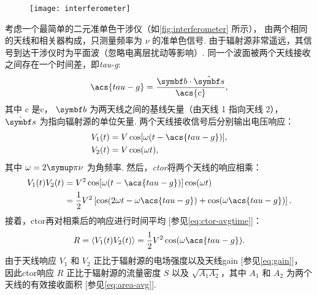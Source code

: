 \begin{figure}[htp]
  \centering
  \texttt{[image: interferometer]}
  \label{fig:interferometer}
\end{figure}

考虑一个最简单的二元准单色干涉仪（如\autoref{fig:interferometer} 所示），
由两个相同的天线和相关器构成，只测量频率为 $\nu$ 的准单色信号.
由于辐射源非常遥远，其信号到达干涉仪时为平面波（忽略电离层扰动等影响）.
同一个波面被两个天线接收之间存在一个时间差，即\emph{\acf{tau-g}}:
\begin{equation}
  \label{eq:tau-g}
  \acs{tau-g} = \frac{\B{b} \cdot \hat{\B{s}}}{\acs{c}},
\end{equation}
其中 \acs{c} 是\acl{c}，
$\B{b}$ 为两天线之间的基线矢量（由天线 1 指向天线 2），
$\hat{\B{s}}$ 为指向辐射源的单位矢量.
两个天线接收信号后分别输出电压响应：
\begin{align}
  V_1(t) &= V \cos [\omega (t - \acs{tau-g})], \\
  V_2(t) &= V \cos (\omega t),
\end{align}
其中 $\omega = 2\Cpi\nu$ 为角频率.
然后，\emph{\acf{ctor}}将两个天线的响应相乘：
\begin{align}
  V_1(t) V_2(t) &= V^2 \cos [\omega (t - \acs{tau-g})] \cos (\omega t) \\
    &= \frac{1}{2} V^2 \left[ \cos (2\omega t - \omega \acs{tau-g})
      + \cos (\omega \acs{tau-g}) \right].
\end{align}
接着，\acl{ctor}再对相乘后的响应进行时间平均 [参见\autoref{eq:ctor-avgtime}]：
\begin{equation}
  \label{eq:resp-corr}
  R = \langle V_1(t) V_2(t) \rangle
    = \frac{1}{2} V^2 \cos (\omega \acs{tau-g}).
\end{equation}
由于天线响应 $V_1$ 和 $V_2$ 正比于辐射源的电场强度以及天线\acl{gain}
[参见\autoref{eq:gain}]，
因此\acl{ctor}响应 $R$ 正比于辐射源的流量密度 $S$
以及 $\sqrt{A_1 A_2}$，其中 $A_1$ 和 $A_2$ 为两个天线的有效接收面积
[参见\autoref{eq:area-avg}].

